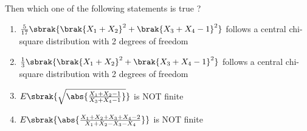 Then which one of the following statements is true ?
\begin{enumerate}
    \item $\frac{5}{17} \sbrak{\brak{X_1 + X_2}^2 + \brak{X_3 + X_4 - 1}^2}$ follows a central chi-square distribution with 2 degrees of freedom
    \item $\frac{1}{3} \sbrak{\brak{X_1 + X_2}^2 + \brak{X_3 + X_4 - 1}^2}$ follows a central chi-square distribution with 2 degrees of freedom
    \item $E \sbrak{\sqrt{\abs{\frac{X_1 + X_2 - 1}{X_3 + X_4 - 1}}}}$ is NOT finite
    \item $E \sbrak{\abs{\frac{X_1 + X_2 + X_3 + X_4 - 2}{X_1 + X_2 - X_3 - X_4}}}$ is NOT finite \\
\end{enumerate}
